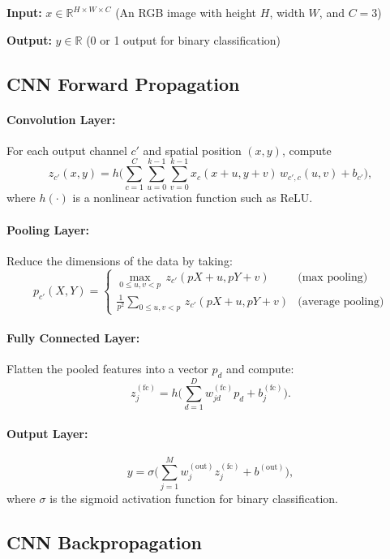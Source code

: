 \documentclass[11pt]{article}
\begin{document}
\noindent
\textbf{Input:} \( x \in \mathbb{R}^{H \times W \times C}\)  
(An RGB image with height \(H\), width \(W\), and \(C=3\))

\noindent
\textbf{Output:} \( y \in \mathbb{R}\)  
(0 or 1 output for binary classification)

\subsection{CNN Forward Propagation}

\paragraph{\normalsize Convolution Layer:}
For each output channel \(c'\) and spatial position \((x,y)\), compute
\[
z_{c'}(x,y) = h\!\Biggl( \sum_{c=1}^{C}\sum_{u=0}^{k-1} \sum_{v=0}^{k-1} x_c(x+u,y+v)\,w_{c',c}(u,v) + b_{c'} \Biggr),
\]
where \(h(\cdot)\) is a nonlinear activation function such as ReLU.

\paragraph{\normalsize Pooling Layer:}
Reduce the dimensions of the data by taking:
\[
p_{c'}(X,Y) = 
  \begin{cases}
    \displaystyle \max_{0 \le u,v < p}\, z_{c'}(pX+u,pY+v) & \text{(max pooling)} \\[2mm]
    \displaystyle \frac{1}{p^2}\sum_{0 \le u,v < p}\, z_{c'}(pX+u,pY+v) & \text{(average pooling)}
  \end{cases}
\]

\paragraph{\normalsize Fully Connected Layer:}
Flatten the pooled features into a vector \(p_d\) and compute:
\[
z_j^{(\mathrm{fc})} = h\!\Biggl( \sum_{d=1}^{D} w_{j d}^{(\mathrm{fc})} p_d + b_j^{(\mathrm{fc})} \Biggr).
\]

\paragraph{\normalsize Output Layer:}
\[
y = \sigma\!\Biggl( \sum_{j=1}^{M} w_{j}^{(\mathrm{out})} z_j^{(\mathrm{fc})} + b^{(\mathrm{out})} \Biggr),
\]
where \(\sigma\) is the sigmoid activation function for binary classification.

\subsection{CNN Backpropagation}
\end{document}

